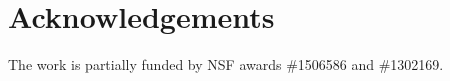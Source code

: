 \documentclass[twocolumn,5p]{elsarticle}
\newcommand{\be}{\begin{enumerate}}
\newcommand{\review}[1]{\noindent\textit{#1\\}}
\theoremstyle{break}
\begin{document}
	
	\section*{Acknowledgements}
	The work is partially funded by NSF  awards \#1506586 and \#1302169.
	
	\balance
	
	

	
%	
%	
%	
%	
%	
%	
%	
\end{document}
